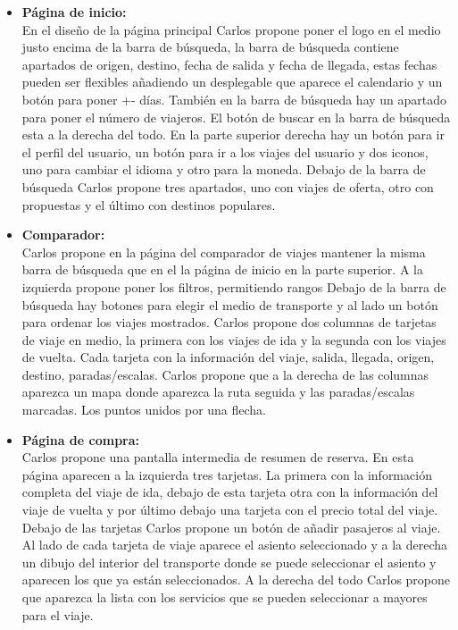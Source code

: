 \begin{itemize}
    \item\textbf{Página de inicio:} \\ En el diseño de la página principal Carlos propone poner el logo en el medio justo encima de la barra de búsqueda, la barra de búsqueda contiene apartados de origen, destino, fecha de salida y fecha de llegada, estas fechas pueden ser flexibles añadiendo un desplegable que aparece el calendario y un botón para poner +- días. También en la barra de búsqueda hay un apartado para poner el número de viajeros.
    El botón de buscar en la barra de búsqueda esta a la derecha del todo.
    En la parte superior derecha hay un botón para ir el perfil del usuario, un botón para ir a los viajes del usuario y dos iconos, uno para cambiar el idioma y otro para la moneda.
    Debajo de la barra de búsqueda Carlos propone tres apartados, uno con viajes de oferta, otro con propuestas y el último con destinos populares.
    
    
    \item\textbf{Comparador:} \\ Carlos propone en la página del comparador de viajes mantener la misma barra de búsqueda que en el la página de inicio en la parte superior.
    A la izquierda propone poner los filtros, permitiendo rangos 
    Debajo de la barra de búsqueda hay botones para elegir el medio de transporte y al lado un botón para ordenar los viajes mostrados.
    Carlos propone dos columnas de tarjetas de viaje en medio, la primera con los viajes de ida y la segunda con los viajes de vuelta.
    Cada tarjeta con la información del viaje, salida, llegada, origen, destino, paradas/escalas.
    Carlos propone que a la derecha de las columnas aparezca un mapa donde aparezca la ruta seguida y las paradas/escalas marcadas. Los puntos unidos por una flecha.
    
    \item\textbf{Página de compra:} \\ Carlos propone una pantalla intermedia de resumen de reserva. 
    En esta página aparecen a la izquierda tres tarjetas. La primera con la información completa del viaje de ida, debajo de esta tarjeta otra con la información del viaje de vuelta y por último debajo una tarjeta con el precio total del viaje.
    Debajo de las tarjetas Carlos propone un botón de añadir pasajeros al viaje.
    Al lado de cada tarjeta de viaje aparece el asiento seleccionado y a la derecha un dibujo del interior del transporte donde se puede seleccionar el asiento y aparecen los que ya están seleccionados. 
    A la derecha del todo Carlos propone que aparezca la lista con los servicios que se pueden seleccionar a mayores para el viaje.
    

\end{itemize}

